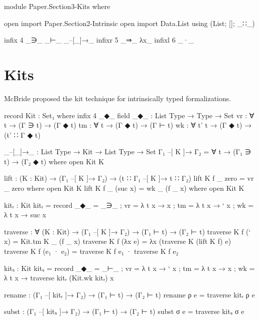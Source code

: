 \begin{code}[hide]
module Paper.Section3-Kits where

open import Paper.Section2-Intrinsic
open import Data.List using (List; []; _∷_)

infix  4  _∋_  _⊢_  _–[_]→_
infixr 5  _⇒_  λx_
infixl 6  _·_
\end{code}

\newpage
\section{Kits}

McBride proposed the kit technique for intrinsically typed formalizations.

\begin{code}
record Kit : Set₁ where
  infix 4 _◆_
  field
    _◆_  : List Type → Type → Set
    vr   : ∀ t → (Γ ∋ t) → (Γ ◆ t)
    tm   : ∀ t → (Γ ◆ t) → (Γ ⊢ t)
    wk   : ∀ {t'} t → (Γ ◆ t) → (t' ∷ Γ ◆ t)

_–[_]→_ : List Type → Kit → List Type → Set
Γ₁ –[ K ]→ Γ₂ = ∀ t → (Γ₁ ∋ t) → (Γ₂ ◆ t) where open Kit K

lift : (K : Kit) → (Γ₁ –[ K ]→ Γ₂) → (t ∷ Γ₁ –[ K ]→ t ∷ Γ₂)
lift K f _ zero     = vr _ zero     where open Kit K
lift K f _ (suc x)  = wk _ (f _ x)  where open Kit K

kitᵣ : Kit
kitᵣ = record {  _◆_  =  _∋_
              ;  vr   = λ t x → x
              ;  tm   = λ t x → ` x
              ;  wk   = λ t x → suc x
              }

traverse : ∀ (K : Kit) → (Γ₁ –[ K ]→ Γ₂) → (Γ₁ ⊢ t) → (Γ₂ ⊢ t)
traverse K f (` x)      = Kit.tm K _ (f _ x)
traverse K f (λx e)     = λx (traverse K (lift K f) e)
traverse K f (e₁ · e₂)  = traverse K f e₁ · traverse K f e₂

kitₛ : Kit
kitₛ = record {  _◆_  = _⊢_
              ;  vr   = λ t x → ` x
              ;  tm   = λ t x → x
              ;  wk   = λ t x → traverse kitᵣ (Kit.wk kitᵣ) x
              }

rename : (Γ₁ –[ kitᵣ ]→ Γ₂) → (Γ₁ ⊢ t) → (Γ₂ ⊢ t)
rename ρ e = traverse kitᵣ ρ e

subst : (Γ₁ –[ kitₛ ]→ Γ₂) → (Γ₁ ⊢ t) → (Γ₂ ⊢ t)
subst σ e = traverse kitₛ σ e
\end{code}
